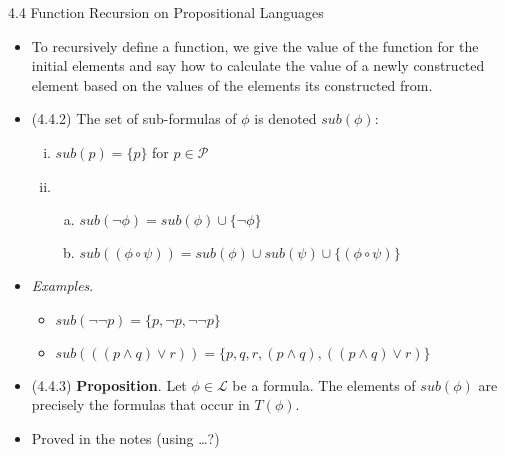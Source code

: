 \begin{frame}{4.4 Function Recursion on Propositional Languages}


	\begin{itemize}
	
 		\item \alert{To recursively define a function, we give the value of the function for the initial elements and say how to calculate the value of a newly constructed element based on the values of the elements its constructed from.}
		
		\item (4.4.2) The set of sub-formulas of $\phi$ is denoted $sub(\phi)$:
		\begin{enumerate}[(i)]
		
			\item $sub(p)=\{p\}$ for $p\in\mathcal{P}$
			
			\item \begin{enumerate}[(a)]
			
				\item $sub(\neg\phi)= sub(\phi)\cup\{\neg \phi\}$
				
				\item $sub((\phi\circ\psi))= sub(\phi)\cup sub(\psi)\cup\{(\phi\circ\psi)\}$
			
			\end{enumerate}
			\end{enumerate}
			
		\item \emph{Examples}.
		
		\begin{itemize}
		
			\item $sub(\neg \neg p)=\{p,\neg p, \neg\neg p\}$
			
			\item $sub(((p\land q)\lor r))=\{p,q,r,(p\land q), ((p\land q)\lor r)\}$
		
		\end{itemize}
		
		\item (4.4.3) \textbf{Proposition}. Let $\phi\in\mathcal{L}$ be a formula. The elements of $sub(\phi)$ are precisely the formulas that occur in $T(\phi)$.
		
		\item Proved in the notes (using \dots?) 
	\end{itemize}

\end{frame}

